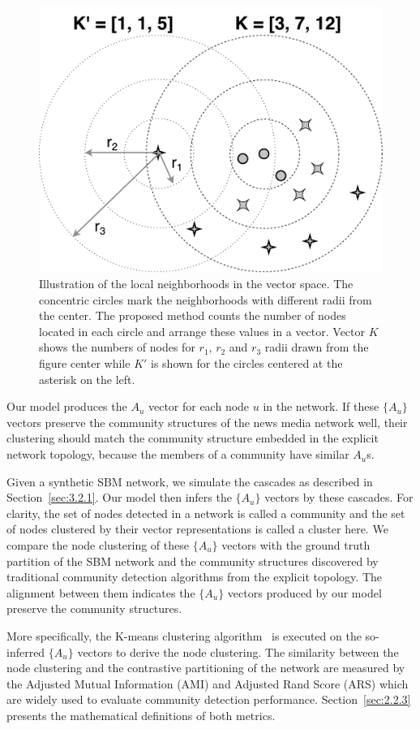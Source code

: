 \begin{figure}
    \centering
    \includegraphics[width=.7\textwidth]{img/chap3/hood.pdf}
    \caption{Illustration of the local neighborhoods in the vector space. The concentric circles mark the neighborhoods with different radii from the center. The proposed method counts the number of nodes located in each circle and arrange these values in a vector. Vector $K$ shows the numbers of nodes for $r_1$, $r_2$ and $r_3$ radii drawn from the figure center while $K'$ is shown for the circles centered at the asterisk on the left.}
    \label{fig:hood}
\end{figure}

Our model produces the $A_u$ vector for each node $u$ in the network. If these $\{A_u\}$ vectors preserve the community structures of the news media network well, their clustering should match the community structure embedded in the explicit network topology, because the members of a community have similar $A_u$s.

Given a synthetic SBM network, we simulate the cascades as described in Section~\ref{sec:3.2.1}. Our model then infers the $\{A_u\}$ vectors by these cascades. For clarity, the set of nodes detected in a network is called a community and the set of nodes clustered by their vector representations is called a cluster here. We compare the node clustering of these $\{A_u\}$ vectors with the ground truth partition of the SBM network and the community structures discovered by traditional community detection algorithms from the explicit topology. The alignment between them indicates the $\{A_u\}$ vectors produced by our model preserve the community structures.

More specifically, the K-means clustering algorithm~\cite{macqueen1967some} is executed on the so-inferred $\{A_u\}$ vectors to derive the node clustering. The similarity between the node clustering and the contrastive partitioning of the network are measured by the Adjusted Mutual Information (AMI) and Adjusted Rand Score (ARS) which are widely used to evaluate community detection performance. Section~\ref{sec:2.2.3} presents the mathematical definitions of both metrics.

